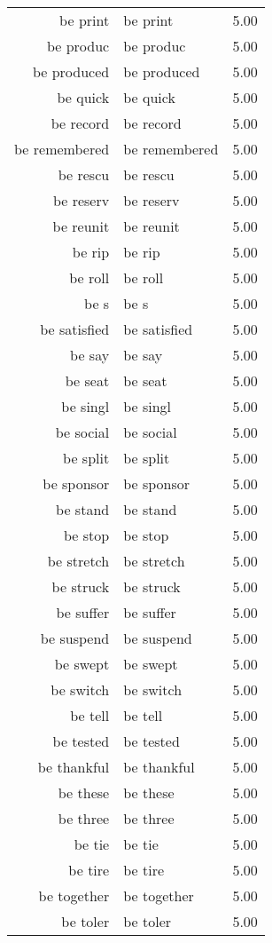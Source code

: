 \begin{table}[ht]
\begin{tabular}{rlr}
  be print & be print & 5.00 \\ 
  be produc & be produc & 5.00 \\ 
  be produced & be produced & 5.00 \\ 
  be quick & be quick & 5.00 \\ 
  be record & be record & 5.00 \\ 
  be remembered & be remembered & 5.00 \\ 
  be rescu & be rescu & 5.00 \\ 
  be reserv & be reserv & 5.00 \\ 
  be reunit & be reunit & 5.00 \\ 
  be rip & be rip & 5.00 \\ 
  be roll & be roll & 5.00 \\ 
  be s & be s & 5.00 \\ 
  be satisfied & be satisfied & 5.00 \\ 
  be say & be say & 5.00 \\ 
  be seat & be seat & 5.00 \\ 
  be singl & be singl & 5.00 \\ 
  be social & be social & 5.00 \\ 
  be split & be split & 5.00 \\ 
  be sponsor & be sponsor & 5.00 \\ 
  be stand & be stand & 5.00 \\ 
  be stop & be stop & 5.00 \\ 
  be stretch & be stretch & 5.00 \\ 
  be struck & be struck & 5.00 \\ 
  be suffer & be suffer & 5.00 \\ 
  be suspend & be suspend & 5.00 \\ 
  be swept & be swept & 5.00 \\ 
  be switch & be switch & 5.00 \\ 
  be tell & be tell & 5.00 \\ 
  be tested & be tested & 5.00 \\ 
  be thankful & be thankful & 5.00 \\ 
  be these & be these & 5.00 \\ 
  be three & be three & 5.00 \\ 
  be tie & be tie & 5.00 \\ 
  be tire & be tire & 5.00 \\ 
  be together & be together & 5.00 \\ 
  be toler & be toler & 5.00 \\ 

\end{tabular}
\end{table}
